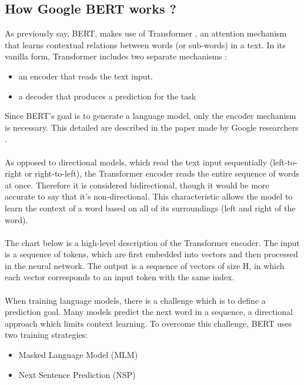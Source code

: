 \subsection{How Google BERT works ?}
As previously say, BERT,  makes use of Transformer  \cite{Vaswani2017}, an attention mechanism that learns contextual relations between words (or sub-words) in a text. In its vanilla form, Transformer includes two separate mechanisms : 

\begin{itemize}
\item an encoder that reads the text input.
\item a decoder that produces a prediction for the task
\end{itemize}

Since BERT’s goal is to generate a language model, only the encoder mechanism is necessary. This detailed are described in the paper  made by Google researchers \citeauthor{Devlin2018} \cite{Devlin2018}. \\
\\
As opposed to directional models, which read the text input sequentially (left-to-right or right-to-left), the Transformer encoder reads the entire sequence of words at once. Therefore it is considered bidirectional, though it would be more accurate to say that it’s non-directional. This characteristic allows the model to learn the context of a word based on all of its surroundings (left and right of the word).\\
\\
The chart below is a high-level description of the Transformer encoder. The input is a sequence of tokens, which are first embedded into vectors and then processed in the neural network. The output is a sequence of vectors of size H, in which each vector corresponds to an input token with the same index. \\
\\
When training language models, there is a challenge which is to define a prediction goal. Many models predict the next word in a sequence, a directional approach which limits context learning. To overcome this challenge, BERT uses two training strategies:

\begin{itemize}
\item Masked Language Model (MLM)
\item Next Sentence Prediction (NSP)
\end{itemize}

